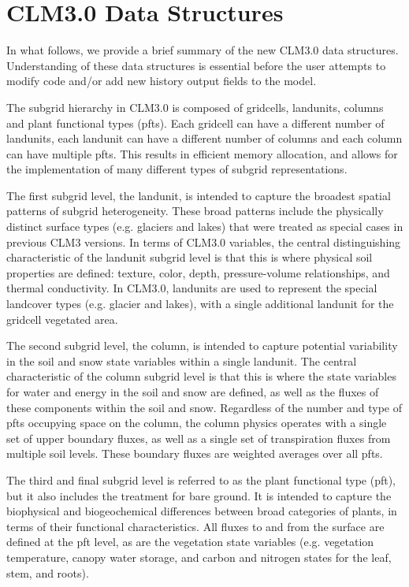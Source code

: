 \section{CLM3.0 Data Structures}
\label{sec_data_structures}

In what follows, we provide a brief summary of the new CLM3.0 data
structures. Understanding of these data structures is essential before
the user attempts to modify code and/or add new history output fields
to the model.

The subgrid hierarchy in CLM3.0 is composed of gridcells, landunits,
columns and plant functional types (pfts).  Each gridcell can have a
different number of landunits, each landunit can have a different
number of columns and each column can have multiple pfts.  This
results in efficient memory allocation, and allows for the
implementation of many different types of subgrid representations.

The first subgrid level, the landunit, is intended to capture the
broadest spatial patterns of subgrid heterogeneity.  These broad
patterns include the physically distinct surface types (e.g. glaciers
and lakes) that were treated as special cases in previous CLM3
versions. In terms of CLM3.0 variables, the central distinguishing
characteristic of the landunit subgrid level is that this is where
physical soil properties are defined: texture, color, depth,
pressure-volume relationships, and thermal conductivity.  In CLM3.0,
landunits are used to represent the special landcover types
(e.g. glacier and lakes), with a single additional landunit for the
gridcell vegetated area.

The second subgrid level, the column, is intended to capture potential
variability in the soil and snow state variables within a single
landunit.  The central characteristic of the column subgrid level is
that this is where the state variables for water and energy in the
soil and snow are defined, as well as the fluxes of these components
within the soil and snow.  Regardless of the number and type of pfts
occupying space on the column, the column physics operates with a
single set of upper boundary fluxes, as well as a single set of
transpiration fluxes from multiple soil levels.  These boundary fluxes
are weighted averages over all pfts.

The third and final subgrid level is referred to as the plant
functional type (pft), but it also includes the treatment for bare
ground.  It is intended to capture the biophysical and biogeochemical
differences between broad categories of plants, in terms of their
functional characteristics.  All fluxes to and from the surface 
are defined at the pft level, as are the vegetation state variables
(e.g. vegetation temperature, canopy water storage, and carbon and
nitrogen states for the leaf, stem, and roots).

